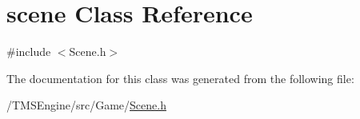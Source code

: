 \hypertarget{classscene}{}\section{scene Class Reference}
\label{classscene}


{\ttfamily \#include $<$Scene.\+h$>$}



The documentation for this class was generated from the following file\+:\begin{DoxyCompactItemize}
\item 
/\+T\+M\+S\+Engine/src/\+Game/\hyperlink{_scene_8h}{Scene.\+h}\end{DoxyCompactItemize}

